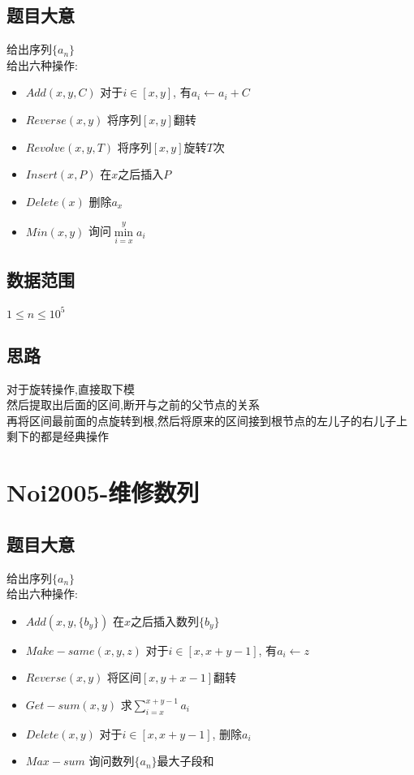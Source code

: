 \documentclass{ctexart}
\numberwithin{equation}{section}
\begin{document}
\begin{flushleft}
  \subsection{题目大意}
  给出序列$\{a_n\}$\\
  给出六种操作:\\
  \begin{itemize}
  \item $Add(x,y,C)$ 对于$i\in [x,y]$, 有$a_i \leftarrow a_i+C$
  \item $Reverse(x,y)$ 将序列$[x,y]$翻转
  \item $Revolve(x,y,T)$ 将序列$[x,y]$旋转$T$次
  \item $Insert(x,P)$ 在$x$之后插入$P$
  \item $Delete(x)$ 删除$a_x$
  \item $Min(x,y)$ 询问$\min\limits_{i=x}^ya_i$
  \end{itemize}
  \subsection{数据范围}
  $1\le n \le 10^5$
  \subsection{思路}
  对于旋转操作,直接取下模\\
  然后提取出后面的区间,断开与之前的父节点的关系\\
  再将区间最前面的点旋转到根,然后将原来的区间接到根节点的左儿子的右儿子上\\
  剩下的都是经典操作\\
  \newpage

  \section{Noi2005-维修数列}
  \subsection{题目大意}
  给出序列$\{a_n\}$\\
  给出六种操作:\\
  \begin{itemize}
  \item $Add(x,y,\{b_y\})$ 在$x$之后插入数列$\{b_y\}$
  \item $Make-same(x,y,z)$ 对于$i\in [x,x+y-1]$, 有$a_i \leftarrow z$
  \item $Reverse(x,y)$ 将区间$[x,y+x-1]$翻转
  \item $Get-sum(x,y)$ 求$\sum\limits_{i=x}^{x+y-1}a_i$
  \item $Delete(x,y)$ 对于$i\in [x,x+y-1]$, 删除$a_i$
  \item $Max-sum$ 询问数列$\{a_n\}$最大子段和
  \end{itemize}

\end{flushleft}
\end{document}
